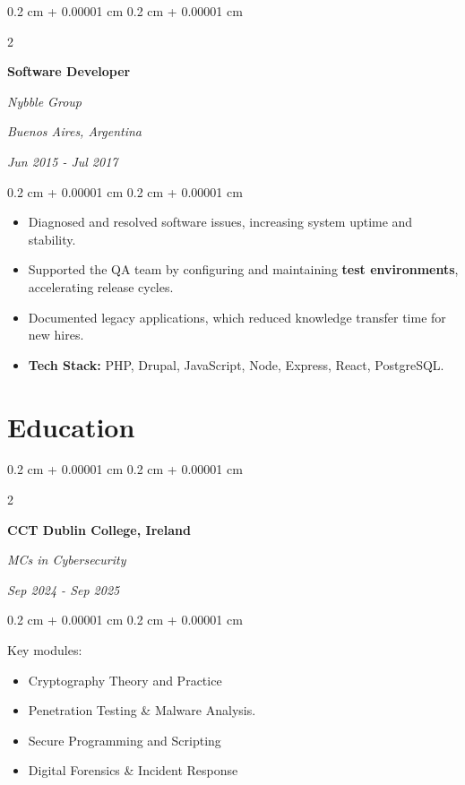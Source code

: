 \documentclass[10pt, letterpaper]{article}
\newenvironment{highlights}{
    \begin{itemize}[
        topsep=0.10 cm,
        parsep=0.10 cm,
        partopsep=0pt,
        itemsep=0pt,
        leftmargin=0.4 cm + 10pt
    ]
}{
    \end{itemize}
} %
\newenvironment{onecolentry}{
    \begin{adjustwidth}{
        0.2 cm + 0.00001 cm
    }{
        0.2 cm + 0.00001 cm
    }
}{
    \end{adjustwidth}
} %
\newenvironment{twocolentry}[2][]{
    \onecolentry
    \def\secondColumn{#2}
    \setcolumnwidth{\fill, 4.5 cm}
    \begin{paracol}{2}
}{
    \switchcolumn \raggedleft \secondColumn
    \end{paracol}
    \endonecolentry
} %
\begin{document}
        \vspace{0.2 cm}

        \begin{twocolentry}{
        \textit{Buenos Aires, Argentina}

        \textit{Jun 2015 - Jul 2017}}
            \textbf{Software Developer}

            \textit{Nybble Group}
        \end{twocolentry}

        \vspace{0.10 cm}
        \begin{onecolentry}
            \begin{highlights}
                \item Diagnosed and resolved software issues, increasing system uptime and stability.
                \item Supported the QA team by configuring and maintaining \textbf{test environments}, accelerating release cycles.
                \item Documented legacy applications, which reduced knowledge transfer time for new hires.
                \item \textbf{Tech Stack:} PHP, Drupal, JavaScript, Node, Express, React, PostgreSQL.
            \end{highlights}
        \end{onecolentry}

    \section{Education}


        \begin{twocolentry}{
        \textit{Sep 2024 - Sep 2025}}
            \textbf{CCT Dublin College, Ireland}

            \textit{MCs in Cybersecurity}
        \end{twocolentry}

        \vspace{0.10 cm}
        \begin{onecolentry}
        Key modules:
            \begin{highlights}
                \item Cryptography Theory and Practice
                \item Penetration Testing \& Malware Analysis.
                \item Secure Programming and Scripting
                \item Digital Forensics \& Incident Response
            \end{highlights}
        \end{onecolentry}
\end{document}
